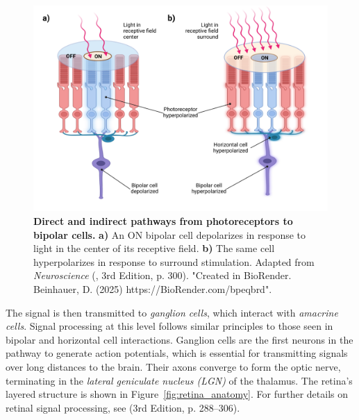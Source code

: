 \begin{figure}
    \centering
    \includegraphics[width=\linewidth]{img/on_off_cells.pdf}
    \caption{\textbf{Direct and indirect pathways from photoreceptors to bipolar cells.} \textbf{a)} An ON bipolar cell depolarizes in response to light in the center of its receptive field. \textbf{b)} The same cell hyperpolarizes in response to surround stimulation. Adapted from \emph{Neuroscience} (\citet{bear2020neuroscience}, 3rd Edition, p. 300). "Created in BioRender. Beinhauer, D. (2025) https://BioRender.com/bpeqbrd".}
    \label{fig:on_off_cells}
\end{figure}

The signal is then transmitted to \emph{ganglion cells}, which interact with \emph{amacrine cells}. Signal processing at this level follows similar principles to those seen in bipolar and horizontal cell interactions. Ganglion cells are the first neurons in the pathway to generate action potentials, which is essential for transmitting signals over long distances to the brain. Their axons converge to form the optic nerve, terminating in the \emph{lateral geniculate nucleus (LGN)} of the thalamus. The retina's layered structure is shown in Figure~\ref{fig:retina_anatomy}. For further details on retinal signal processing, see \citet{bear2020neuroscience} (3rd Edition, p. 288--306).


